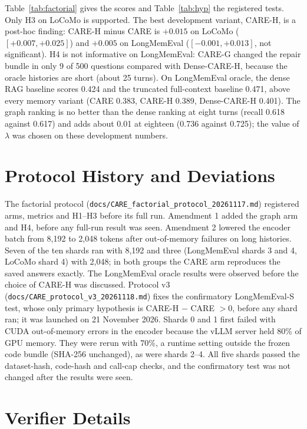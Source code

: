 \documentclass[10pt]{article}
\theoremstyle{plain}
\newcommand{\care}{\textsc{CARE}}
\begin{document}
Table~\ref{tab:factorial} gives the scores and Table~\ref{tab:hyp} the registered tests. Only H3 on LoCoMo is supported. The best development variant, CARE-H, is a post-hoc finding: CARE-H minus \care{} is
$+0.015$ on LoCoMo ($[+0.007,+0.025]$) and $+0.005$ on LongMemEval ($[-0.001,+0.013]$, not significant). H4 is not
informative on LongMemEval: CARE-G changed the repair bundle in only 9 of 500 questions compared with Dense-CARE-H,
because the oracle histories are short (about 25 turns). On LongMemEval oracle, the dense RAG baseline scores 0.424 and
the truncated full-context baseline 0.471, above every memory variant (\care{} 0.383, CARE-H 0.389, Dense-CARE-H 0.401).
The graph ranking is no better than the dense ranking at eight turns (recall 0.618 against 0.617) and adds about 0.01
at eighteen (0.736 against 0.725); the value of $\lambda$ was chosen on these development numbers.

\section{Protocol History and Deviations}
\label{app:protocol}

The factorial protocol (\texttt{docs/CARE\_factorial\_protocol\_20261117.md}) registered arms, metrics and H1--H3
before its full run. Amendment 1 added the graph arm and H4, before any full-run result was seen. Amendment 2
lowered the encoder batch from 8,192 to 2,048 tokens after out-of-memory failures on long histories. Seven of the
ten shards ran with 8,192 and three (LongMemEval shards 3 and 4, LoCoMo shard 4) with 2,048; in both groups the \care{}
arm reproduces the saved answers exactly. The LongMemEval oracle results were observed before the choice of CARE-H was
discussed. Protocol v3 (\texttt{docs/CARE\_protocol\_v3\_20261118.md}) fixes the confirmatory LongMemEval-S test, whose
only primary hypothesis is CARE-H $-$ \care{} $>0$, before any shard ran; it was launched on 21 November 2026. Shards 0 and 1 first failed with CUDA out-of-memory errors
in the encoder because the vLLM server held 80\% of GPU memory. They were rerun with 70\%, a runtime setting outside the
frozen code bundle (SHA-256 unchanged), as were shards 2--4. All five shards passed the dataset-hash, code-hash and
call-cap checks, and the confirmatory test was not changed after the results were seen.

\section{Verifier Details}
\label{app:verifiers}
\end{document}
